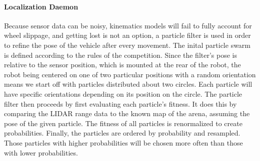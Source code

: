 \paragraph{Localization Daemon}
Because sensor data can be noisy, kinematics models will fail to fully account for wheel slippage, and getting lost is not an option, a particle filter is used in order to refine the pose of the vehicle after every movement.  The inital particle swarm is defined according to the rules of the competition.  Since the filter's pose is relative to the sensor position, which is mounted at the rear of the robot, the robot being centered on one of two particular positions with a random orientation means we start off with particles distributed about two circles.  Each particle will have specific orientations depending on its position on the circle.  The particle filter then proceeds by first evaluating each particle's fitness.  It does this by comparing the LIDAR range data to the known map of the arena, assuming the pose of the given particle.  The fitness of all particles is renormalized to create probabilities.  Finally, the particles are ordered by probability and resampled.  Those particles with higher probabilities will be chosen more often than those with lower probabilities.
